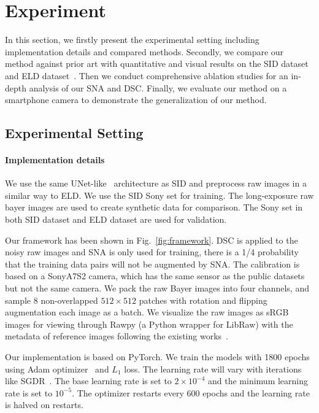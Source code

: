 \documentclass[sigconf,screen,nonacm]{acmart}
\begin{document}
\section{Experiment}
    In this section, we firstly present the experimental setting including implementation details and compared methods.
Secondly, we compare our method against prior art with quantitative and visual results on the SID dataset~\cite{CVPR18/SID} and ELD dataset~\cite{TPAMI21/ELD}.
    Then we conduct comprehensive ablation studies for an in-depth analysis of our SNA and DSC.
    Finally, we evaluate our method on a smartphone camera to demonstrate the generalization of our method.
  \subsection{Experimental Setting} \label{subsec:setting}
    \paragraph{\textbf{Implementation details}}
    We use the same UNet-like~\cite{Unet} architecture as SID and preprocess raw images in a similar way to ELD.
We use the SID Sony set for training. The long-exposure raw bayer images are used to create synthetic data for comparison.
    The Sony set in both SID dataset and ELD dataset are used for validation.

    Our framework has been shown in Fig.~\ref{fig:framework}. DSC is applied to the noisy raw images and SNA is only used for training, there is a 1/4 probability that the training data pairs will not be augmented by SNA. The calibration is based on a SonyA7S2 camera, which has the same sensor as the public datasets but not the same camera.
    We pack the raw Bayer images into four channels, and sample 8 non-overlapped $512 \times 512$ patches with rotation and flipping augmentation each image as a batch. We visualize the raw images as sRGB images for viewing through Rawpy (a Python wrapper for LibRaw) with the metadata of reference images following the existing works~\cite{CVPR18/SID, TPAMI21/ELD}.




    Our implementation is based on PyTorch.
We train the models with 1800 epochs using Adam optimizer~\cite{Adam} and $L_1$ loss. The learning rate will vary with iterations like SGDR~\cite{ICLR17/SGDR}. The base learning rate is set to $2\times10^{-4}$ and the minimum learning rate is set to $10^{-5}$. The optimizer restarts every 600 epochs and the learning rate is halved on restarts.
\end{document}
